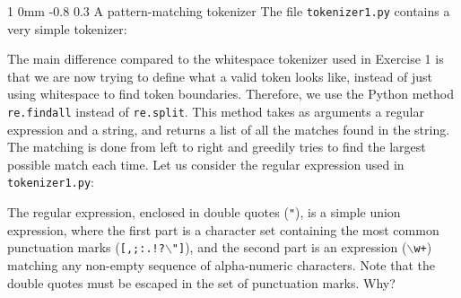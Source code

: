 \documentclass[11pt]{article}
\makeatletter
\newcommand{\newsec}[2]{\section{#1}\label{sec:#2}\noindent}
\renewcommand{\section}{\@startsection
{section}%
{1}%
{0mm}%
{-0.8\baselineskip}%
{0.3\baselineskip}%
{\bfseries\large}}%
\renewcommand{\paragraph}{%
  \@startsection{paragraph}{4}%
  {\z@}{1.5ex \@plus 1ex \@minus .2ex}{-1em}%
  {\normalfont\normalsize\bfseries}%
}\makeatother
\makeatother
\begin{document}
\newsec{A pattern-matching tokenizer}{tokenize}%
The file {\tt tokenizer1.py} contains a very simple tokenizer:
\begin{center}
\fbox{

}
\end{center}
The main difference compared to the whitespace tokenizer used in Exercise 1 is that we are now trying to define what a valid token looks like, instead of just using whitespace
to find token boundaries. Therefore, we use the Python method {\tt re.findall} instead of {\tt re.split}. This method takes as arguments a regular expression and a string, and returns
a list of all the matches found in the string. The matching is done from left to right and greedily tries to find the largest possible match each time. Let us consider the regular 
expression used in {\tt tokenizer1.py}:
\begin{center}
\fbox{

}
\end{center}
The regular expression, enclosed in double quotes ({\tt "}), is a simple union expression, where the first part is a character set containing the most common punctuation marks
({\tt [,;:.!?$\backslash$"]}), and the second part is an expression ({\tt $\backslash$w+}) matching any non-empty sequence of alpha-numeric characters. Note that the double
quotes must be escaped in the set of punctuation marks. Why? 

\end{document}
